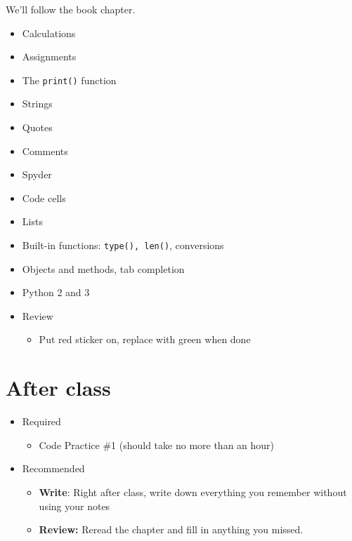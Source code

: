 \documentclass[11pt]{article}
\begin{document}
We'll follow the book chapter.
\begin{itemize}
\item Calculations %
\item Assignments
\item The {\tt print()} function
\item Strings
\item Quotes
\item Comments
\item Spyder
\item Code cells
\item Lists
\item Built-in functions:  {\tt type(), len()}, conversions
\item Objects and methods, tab completion
\item Python 2 and 3
\item Review
\begin{itemize}
\item Put red sticker on, replace with green when done
\end{itemize}
\end{itemize}

\section*{After class}

\begin{itemize}
\item Required
\begin{itemize}
\item Code Practice \#1 (should take no more than an hour)
\end{itemize}
\item Recommended
\begin{itemize}
\item {\bf Write}:  Right after class, write down everything you remember without using your notes
\item {\bf Review:} Reread the chapter and fill in anything you missed.
\end{itemize}
\end{itemize}


\end{document}
